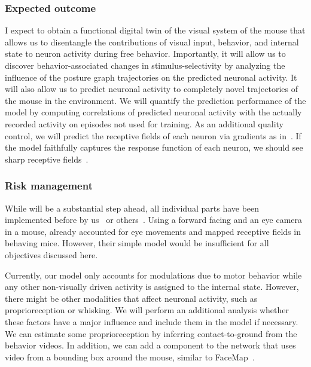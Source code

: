 \documentclass[B2,COG]{ercgrant}
\begin{document}
\subsubsection{Expected outcome} 

I expect to obtain a functional digital twin of the visual system of the mouse that allows us to disentangle the contributions of visual input, behavior, and internal state to neuron activity during free behavior. 
Importantly, it will allow us to discover behavior-associated changes in stimulus-selectivity by analyzing the influence of the posture graph trajectories on the predicted neuronal activity.
It will also allow us to predict neuronal activity to completely novel trajectories of the mouse in the environment.
We will quantify the prediction performance of the model by computing correlations of predicted neuronal activity with the actually recorded activity on episodes not used for training. 
As an additional quality control, we will predict the receptive fields of each neuron via gradients as in~\textcite{Sinz2018-sk}. 
If the model faithfully captures the response function of each neuron, we should see sharp receptive fields~\parencite{Parker2022-ac}.

\subsubsection{Risk management} 
While  will be a substantial step ahead, all individual parts have been implemented before by us~\parencite{Sinz2018-sk, Bashiri2021-or} or others~\parencite{Parker2022-ac,Holmgren2021-jv}. 
Using a forward facing and an eye camera in a mouse, \textcite{Parker2022-ac} already accounted for eye movements and mapped receptive fields in behaving mice. However, their simple model would be insufficient for all objectives discussed here.


Currently, our model only accounts for modulations due to motor behavior while any other non-visually driven activity is assigned to the internal state. 
However, there might be other modalities that affect neuronal activity, such as proprioreception or whisking. 
We will perform an additional analysis whether these factors have a major influence and include them in the model if necessary. 
We can estimate some proprioreception by inferring contact-to-ground from the behavior videos.
In addition, we can add a component to the network that uses video from a bounding box around the mouse, similar to FaceMap~\parencite{Syeda2022-bk}.
\end{document}
